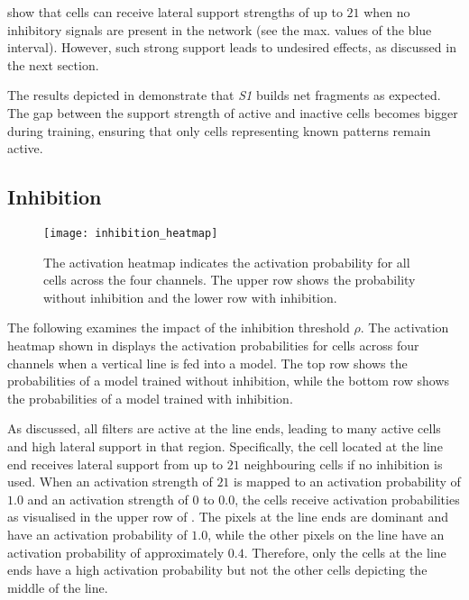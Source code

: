  show that cells can receive lateral support strengths of up to $21$ when no inhibitory signals are present in the network (see the max. values of the blue interval).
However, such strong support leads to undesired effects, as discussed in the next section.

The results depicted in  demonstrate that \emph{S1} builds net fragments as expected. The gap between the support strength of active and inactive cells becomes bigger during training, ensuring that only cells representing known patterns remain active.

\subsection{Inhibition}
%
\begin{figure}[h]
    \centering
    \texttt{[image: inhibition\_heatmap]}
    \caption[Activation heatmap with/without inhibition]{The activation heatmap indicates the activation probability for all cells across the four channels. The upper row shows the probability without inhibition and the lower row with inhibition.}
\end{figure}
%
The following examines the impact of the inhibition threshold $\rho$. The activation heatmap shown in  displays the activation probabilities for cells across four channels when a vertical line is fed into a model.
The top row shows the probabilities of a model trained without inhibition, while the bottom row shows the probabilities of a model trained with inhibition.

As discussed, all filters are active at the line ends, leading to many active cells and high lateral support in that region.
Specifically, the cell located at the line end receives lateral support from up to $21$ neighbouring cells if no inhibition is used.
When an activation strength of $21$ is mapped to an activation probability of $1.0$ and an activation strength of $0$ to $0.0$, the cells receive activation probabilities as visualised in the upper row of .
The pixels at the line ends are dominant and have an activation probability of $1.0$, while the other pixels on the line have an activation probability of approximately $0.4$.
Therefore, only the cells at the line ends have a high activation probability but not the other cells depicting the middle of the line.

